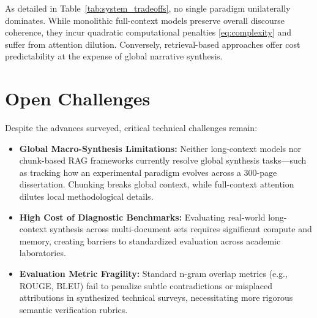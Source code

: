 \documentclass[manuscript]{acmart}
\begin{document}
As detailed in Table~\ref{tab:system_tradeoffs}, no single paradigm unilaterally dominates. While monolithic full-context models preserve overall discourse coherence, they incur quadratic computational penalties \eqref{eq:complexity} and suffer from attention dilution. Conversely, retrieval-based approaches offer cost predictability at the expense of global narrative synthesis.

\section{Open Challenges}\label{sec:challenges}
Despite the advances surveyed, critical technical challenges remain:
\begin{itemize}
    \item \textbf{Global Macro-Synthesis Limitations:} Neither long-context models nor chunk-based RAG frameworks currently resolve global synthesis tasks---such as tracking how an experimental paradigm evolves across a 300-page dissertation. Chunking breaks global context, while full-context attention dilutes local methodological details.
    \item \textbf{High Cost of Diagnostic Benchmarks:} Evaluating real-world long-context synthesis across multi-document sets requires significant compute and memory, creating barriers to standardized evaluation across academic laboratories.
    \item \textbf{Evaluation Metric Fragility:} Standard n-gram overlap metrics (e.g., ROUGE, BLEU) fail to penalize subtle contradictions or misplaced attributions in synthesized technical surveys, necessitating more rigorous semantic verification rubrics.
\end{itemize}
\end{document}
